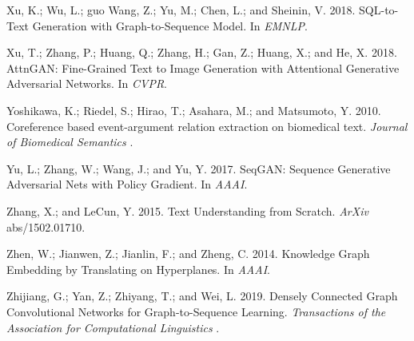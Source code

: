 \documentclass[letterpaper]{article}
\begin{document}
\begin{thebibliography}{43}
Xu, K.; Wu, L.; guo Wang, Z.; Yu, M.; Chen, L.; and Sheinin, V.
  2018{}.
\newblock SQL-to-Text Generation with Graph-to-Sequence Model.
\newblock In \emph{EMNLP}.

Xu, T.; Zhang, P.; Huang, Q.; Zhang, H.; Gan, Z.; Huang, X.; and He, X.
  2018{}.
\newblock AttnGAN: Fine-Grained Text to Image Generation with Attentional
  Generative Adversarial Networks.
\newblock In \emph{CVPR}.

Yoshikawa, K.; Riedel, S.; Hirao, T.; Asahara, M.; and Matsumoto, Y. 2010.
\newblock Coreference based event-argument relation extraction on biomedical
  text.
\newblock \emph{Journal of Biomedical Semantics} .

Yu, L.; Zhang, W.; Wang, J.; and Yu, Y. 2017.
\newblock SeqGAN: Sequence Generative Adversarial Nets with Policy Gradient.
\newblock In \emph{AAAI}.

Zhang, X.; and LeCun, Y. 2015.
\newblock Text Understanding from Scratch.
\newblock \emph{ArXiv} abs/1502.01710.

Zhen, W.; Jianwen, Z.; Jianlin, F.; and Zheng, C. 2014.
\newblock Knowledge Graph Embedding by Translating on Hyperplanes.
\newblock In \emph{AAAI}.

Zhijiang, G.; Yan, Z.; Zhiyang, T.; and Wei, L. 2019.
\newblock Densely Connected Graph Convolutional Networks for Graph-to-Sequence
  Learning.
\newblock \emph{Transactions of the Association for Computational Linguistics}
  .

\end{thebibliography}
 


\onecolumn
\appendix
\end{document}
